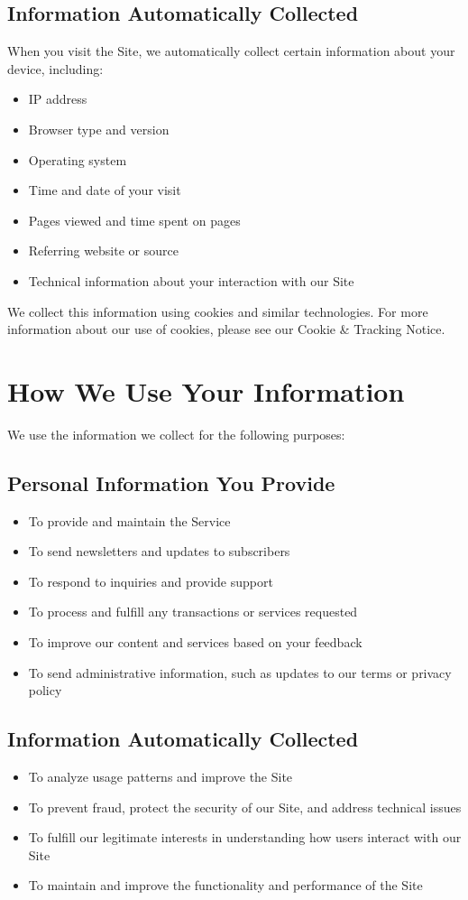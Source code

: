 \documentclass[11pt]{article}
\begin{document}
\subsection{Information Automatically Collected}
When you visit the Site, we automatically collect certain information about your device, including:
\begin{itemize}
  \item IP address
  \item Browser type and version
  \item Operating system
  \item Time and date of your visit
  \item Pages viewed and time spent on pages
  \item Referring website or source
  \item Technical information about your interaction with our Site
\end{itemize}

We collect this information using cookies and similar technologies. For more information about our use of cookies, please see our Cookie \& Tracking Notice.

\section{How We Use Your Information}

We use the information we collect for the following purposes:

\subsection{Personal Information You Provide}
\begin{itemize}
  \item To provide and maintain the Service
  \item To send newsletters and updates to subscribers
  \item To respond to inquiries and provide support
  \item To process and fulfill any transactions or services requested
  \item To improve our content and services based on your feedback
  \item To send administrative information, such as updates to our terms or privacy policy
\end{itemize}

\subsection{Information Automatically Collected}
\begin{itemize}
  \item To analyze usage patterns and improve the Site
  \item To prevent fraud, protect the security of our Site, and address technical issues
  \item To fulfill our legitimate interests in understanding how users interact with our Site
  \item To maintain and improve the functionality and performance of the Site
\end{itemize}
\end{document}
